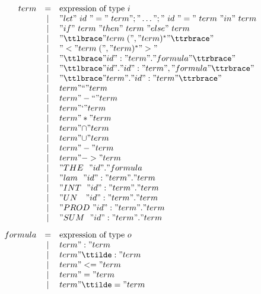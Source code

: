 \begin{figure} 
\dquotes
\[\begin{array}{rcl}
    term & = & \hbox{expression of type~$i$} \\
         & | & "let"~id~"="~term";"\dots";"~id~"="~term~"in"~term \\
         & | & "if"~term~"then"~term~"else"~term \\
         & | & "{\ttlbrace} " term\; ("," term)^* " {\ttrbrace}" \\
         & | & "< "  term\; ("," term)^* " >"  \\
         & | & "{\ttlbrace} " id ":" term " . " formula " {\ttrbrace}" \\
         & | & "{\ttlbrace} " id " . " id ":" term ", " formula " {\ttrbrace}" \\
         & | & "{\ttlbrace} " term " . " id ":" term " {\ttrbrace}" \\
         & | & term " `` " term \\
         & | & term " -`` " term \\
         & | & term " ` " term \\
         & | & term " * " term \\
         & | & term " \isasyminter " term \\
         & | & term " \isasymunion " term \\
         & | & term " - " term \\
         & | & term " -> " term \\
         & | & "THE~~"  id  " . " formula\\
         & | & "lam~~"  id ":" term " . " term \\
         & | & "INT~~"  id ":" term " . " term \\
         & | & "UN~~~"  id ":" term " . " term \\
         & | & "PROD~"  id ":" term " . " term \\
         & | & "SUM~~"  id ":" term " . " term \\[2ex]
 formula & = & \hbox{expression of type~$o$} \\
         & | & term " : " term \\
         & | & term " \ttilde: " term \\
         & | & term " <= " term \\
         & | & term " = " term \\
         & | & term " \ttilde= " term \\

\end{array}\]
\end{figure}
